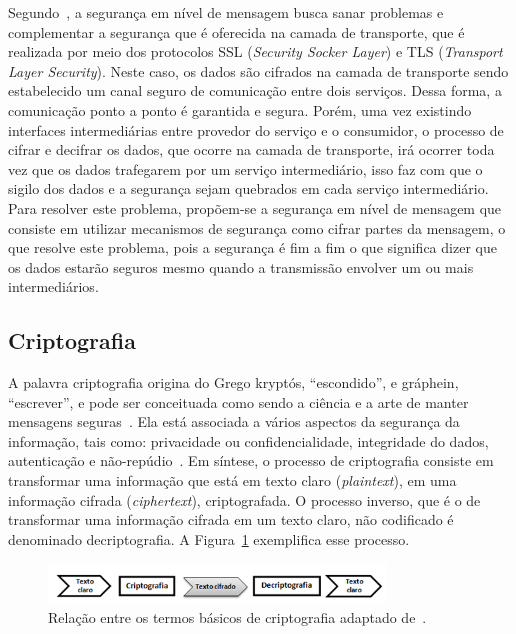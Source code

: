 Segundo~\cite{SOASecurity2008}, a segurança em nível de mensagem busca sanar problemas e complementar a segurança que é oferecida na camada de transporte, que é realizada por meio dos protocolos SSL (\emph{Security Socker Layer}) e TLS (\emph{Transport Layer Security}). Neste caso, os dados são cifrados na camada de transporte sendo estabelecido um canal seguro de comunicação entre dois serviços. Dessa forma, a comunicação ponto a ponto é garantida e segura. Porém, uma vez existindo interfaces intermediárias entre provedor do serviço e o consumidor, o processo de cifrar e decifrar os dados, que ocorre na camada de transporte, irá ocorrer toda vez que os dados trafegarem por um serviço intermediário, isso faz com que o sigilo dos dados e a segurança sejam quebrados em cada serviço intermediário. Para resolver este problema, propõem-se a segurança em nível de mensagem que consiste em utilizar mecanismos de segurança como cifrar partes da mensagem, o que resolve este problema, pois a segurança é fim a fim o que significa dizer que os dados estarão seguros mesmo quando a transmissão envolver um ou mais intermediários.

\subsection{Criptografia}

A palavra criptografia origina do Grego kryptós, ``escondido'', e gráphein, ``escrever'',  e pode ser  conceituada como sendo a ciência e a arte de manter mensagens seguras~\cite{Schneier1995}. Ela está  associada a vários aspectos da segurança da informação, tais como: privacidade ou confidencialidade, integridade do dados, autenticação e não-repúdio~\cite{Menezes1996}. Em síntese, o processo de criptografia consiste em transformar uma informação que está em texto claro (\emph{plaintext}), em uma informação cifrada (\emph{ciphertext}), criptografada. O processo inverso, que é o de transformar uma informação cifrada em um texto claro, não codificado é denominado decriptografia. A Figura~\ref{fig:processocriptografia} exemplifica esse processo.

\begin{figure}[!htb]
\centering
\includegraphics[width=0.8\textwidth]{processocriptografia.png}
\caption{Relação entre os termos  básicos de criptografia adaptado de~\cite{Schneier1995}.}
\label{fig:processocriptografia}
\end{figure}


